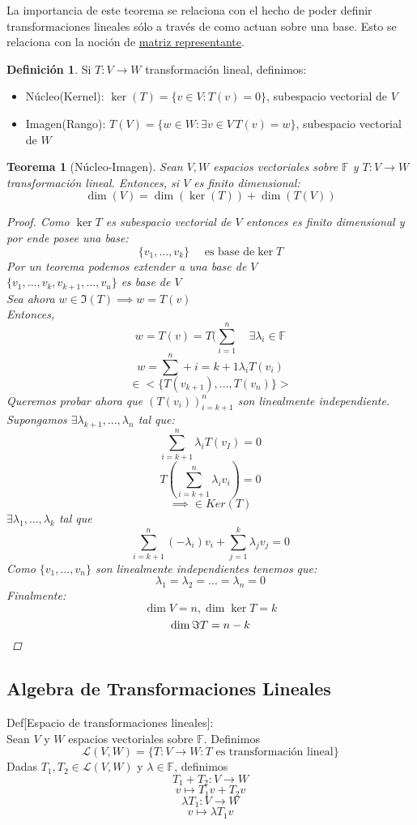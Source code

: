 \documentclass[11pt]{book}
\newtheorem{thm}{Teorema}[section]
\theoremstyle{definition}
\newtheorem{defn}{Definición}[section]
\begin{document}
La importancia de este teorema se relaciona con el hecho de poder definir transformaciones lineales sólo a través de como actuan sobre una base. Esto se relaciona con la noción de \underline{matriz representante}.
\begin{defn}
	Si $T:V\rightarrow W$ transformación lineal, definimos:
	\begin{itemize}
		\item Núcleo(Kernel): $\ker(T)=\{v\in V:T(v)=0\}$, subespacio vectorial de $V$

		\item Imagen(Rango): $T(V)=\{w\in W:\exists v\in V\, T(v)=w\}$, subespacio vectorial de $W$
	\end{itemize}
\end{defn}
\begin{thm}[Núcleo-Imagen]
	Sean $V,W$ espacios vectoriales sobre $\mathbb{F}$ y $T:V\rightarrow W$ transformación lineal. Entonces, si $V$ es finito dimensional:
	\[
		\dim(V)=\dim(\ker(T))+\dim(T(V))
	\]
	\begin{proof}
		Como $\ker T$ es subespacio vectorial de $V$ entonces es finito dimensional y por ende posee una base:
		\[
			\{v_1,...,v_k\} \quad\textrm{ es base de} \ker T
		\]
		Por un teorema podemos extender a una base de $V$\\
		$\{v_1,...,v_k,v_{k+1},...,v_u\}$ es base de $V$\\
		Sea ahora $w\in\Im(T)\implies w=T(v)$\\
		Entonces,
		\[
			w=T(v)=T(\sum^n_{i=1}\quad\exists\lambda_i\in\mathbb{F}
		\]
		\[
			w=\sum^n+{i=k+1}\lambda_iT(v_i)
		\]
		\[
			\in<\{T(v_{k+1}),...,T(v_n)\}>
		\]
		Queremos probar ahora que $(T(v_i))^n_{i=k+1}$ son linealmente independiente. Supongamos $\exists\lambda_{k+1},...,\lambda_{n}$ tal que:
		\[
			\sum^n_{i=k+1}\lambda_iT(v_I)=0
		\]
		\[
			T(\sum^n_{i=k+1}\lambda_iv_i)=0
		\]
		\[
			\implies \in Ker(T)
		\]
		$\exists \lambda_1,...,\lambda_k$ tal que
		\[
			\sum^n_{i=k+1}(-\lambda_i)v_i+\sum^k_{j=1}\lambda_jv_j=0
		\]
		Como $\{v_1,...,v_n\}$ son linealmente independientes tenemos que:
		\[
			\lambda_1=\lambda_2=...=\lambda_n=0
		\]
		Finalmente:
		\[
			\dim V=n,\dim \ker T=k
		\]
		\[
			\dim\Im T=n-k\qedhere
		\]
	\end{proof}
\end{thm}
\subsection{Algebra de Transformaciones Lineales}
Def[Espacio de transformaciones lineales]:\\
Sean $V$ y $W$ espacios vectoriales sobre $\mathbb{F}$. Definimos
\[
	\mathcal{L}(V,W)=\{T:V\rightarrow W:T\textrm{ es transformación lineal}\}
\]
Dadas $T_1,T_2\in\mathcal{L}(V,W)$ y $\lambda\in\mathbb{F}$, definimos
\[
	T_1+T_2:V\rightarrow W
\]
\[
	v\mapsto T_1v+T_2v
\]
\[
	\lambda T_1:V\rightarrow W
\]
\[
	v\mapsto \lambda T_1v
\]
\end{document}
